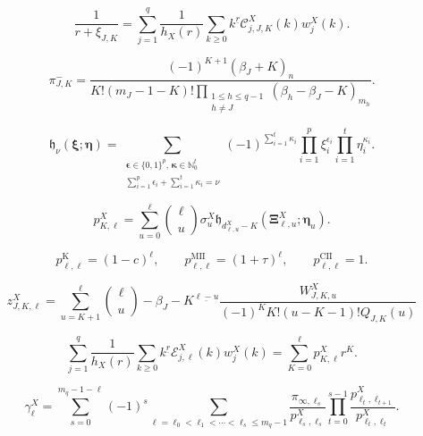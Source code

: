 \documentclass[10pt,a4paper]{amsart}
\newcommand{\Nzero}{\mathbb N_0}
\newcommand{\fall}[2]{#1^{\underline{#2}}}
\begin{document}
\begin{equation}
 \frac1{r+\xi_{J,K}}
 =\sum_{j=1}^q\frac1{h_X(r)}
   \sum_{k\ge0}\fall{k}{r}\mathcal C_{j,J,K}^X(k)w_j^X(k).
 \label{eq:finite-pole-block-pairing}
\end{equation}

\begin{equation}
 \pi_{J,K}^{-}=
 \frac{(-1)^{K+1}(\beta_J+K)_n}
 {K!(m_J-1-K)!
  \prod_{\substack{1\le h\le q-1\\h\ne J}}
  (\beta_h-\beta_J-K)_{m_h}}.
 \label{eq:unreflected-finite-pole-coefficient}
\end{equation}

\begin{equation}
 \mathfrak h_\nu(\boldsymbol\xi;\boldsymbol\eta)
 =\sum_{\substack{\boldsymbol\epsilon\in\{0,1\}^{p},
                   \,\boldsymbol\kappa\in\Nzero^{t}\\
                   \sum_{i=1}^p\epsilon_i+\sum_{i=1}^t\kappa_i=\nu}}
 (-1)^{\sum_{i=1}^t\kappa_i}
 \prod_{i=1}^{p}\xi_i^{\epsilon_i}
 \prod_{i=1}^{t}\eta_i^{\kappa_i}.
 \label{eq:unreflected-Horn-finite-sum}
\end{equation}

\begin{equation}
 p_{K,\ell}^X=
 \sum_{u=0}^{\ell}\binom\ell u\sigma_u^X
 \mathfrak h_{d_{\ell,u}^X-K}
 (\boldsymbol\Xi_{\ell,u}^X;\boldsymbol\eta_u).
 \label{eq:unreflected-infinity-transition}
\end{equation}

\begin{equation}
 p_{\ell,\ell}^{\mathrm K}=(1-c)^\ell,
 \qquad
 p_{\ell,\ell}^{\mathrm{MII}}=(1+\tau)^\ell,
 \qquad
 p_{\ell,\ell}^{\mathrm{CII}}=1.
 \label{eq:unreflected-infinity-pivots}
\end{equation}

\begin{equation}
 z_{J,K,\ell}^X=
 \sum_{u=K+1}^{\ell}\binom\ell u
 \fall{-\beta_J-K}{\ell-u}
 \frac{W_{J,K,u}^X}
 {(-1)^K K!(u-K-1)!Q_{J,K}(u)}
 \label{eq:unreflected-base-residue}
\end{equation}

\begin{equation}
 \sum_{j=1}^q\frac1{h_X(r)}
 \sum_{k\ge0}\fall{k}{r}\mathcal E_{j,\ell}^X(k)w_j^X(k)
 =\sum_{K=0}^{\ell}p_{K,\ell}^Xr^K.
 \label{eq:unreflected-corrected-infinity-pairing}
\end{equation}

\begin{equation}
 \gamma_\ell^X=
 \sum_{s=0}^{m_q-1-\ell}(-1)^s
 \sum_{\ell=\ell_0<\ell_1<\cdots<\ell_s\le m_q-1}
 \frac{\pi_{\infty,\ell_s}}{p_{\ell_s,\ell_s}^X}
 \prod_{t=0}^{s-1}
 \frac{p_{\ell_t,\ell_{t+1}}^X}
      {p_{\ell_t,\ell_t}^X}.
 \label{eq:unreflected-infinity-chain}
\end{equation}
\end{document}
